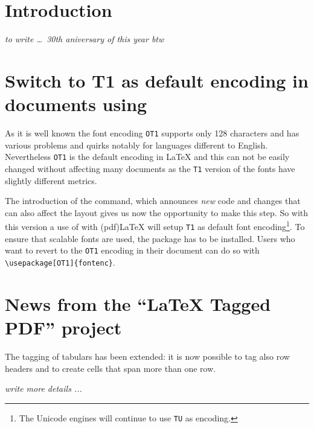 \documentclass{ltnews}
\begin{document}
\maketitle
{  \spaceskip=3.33pt 
\tableofcontents}

\setlength{}

\medskip

\section{Introduction}

\emph{to write \ldots\ 30th aniversary of \LaTeXe{} this year btw}

\section{Switch to T1 as default encoding in documents using }

As it is well known the font encoding \texttt{OT1} supports only 128 characters and 
has various problems and quirks notably for languages different to English. 
Nevertheless \texttt{OT1} is the default encoding in \LaTeX{} and this can not be easily 
changed without affecting many documents as the \texttt{T1} version of the fonts have slightly different metrics. 

The introduction of the  command, which announces 
\emph{new} code and changes that can also affect the layout gives us now the 
opportunity to make this step. So with this version a use of 
 with (pdf)\LaTeX{} will setup  \texttt{T1} as default 
font encoding\footnote{The Unicode engines will continue to use \texttt{TU} 
as encoding.}. To ensure that scalable fonts are used, the package 
 has to be installed. Users who want to revert to the 
\texttt{OT1} encoding in their document can do so with
\verb+\usepackage[OT1]{fontenc}+. 



\section{News from the \enquote{\LaTeX{} Tagged PDF} project}

The tagging of tabulars has been extended: it is now possible to tag
also row headers and to create cells that span more than one row. 

\emph{write more details ...}
\end{document}
